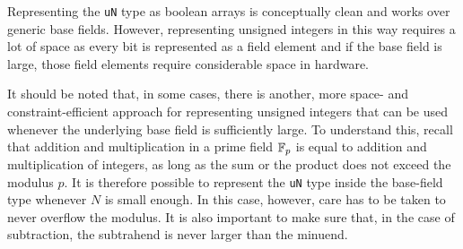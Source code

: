 \begin{remark} Representing the \texttt{uN} type as boolean arrays is conceptually clean and works over generic base fields. However, representing unsigned integers in this way requires a lot of space as every bit is represented as a field element and if the base field is large, those field elements require considerable space in hardware.

It should be noted that, in some cases, there is another, more space- and constraint-efficient approach for representing unsigned integers that can be used whenever the underlying base field is sufficiently large. To understand this, recall that addition and multiplication in a prime field $\mathbb{F}_p$ is equal to addition and multiplication of integers, as long as the sum or the product does not exceed the modulus $p$. It is therefore possible to represent the \texttt{uN} type inside the base-field type whenever $N$ is small enough. In this case, however, care has to be taken to never overflow the modulus. It is also important to make sure that, in the case of subtraction, the subtrahend is never larger than the minuend.
\end{remark}
